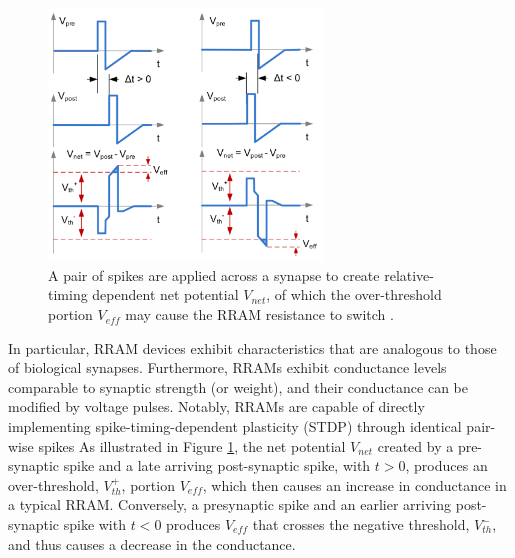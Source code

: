 \begin{figure}[htbp!] 
    \centering    
    \includegraphics[width=0.65\textwidth]{Chapter6/Figs/f.png}
    \caption[A pair of spikes are applied across a synapse to create relative-timing dependent net potential.]{A pair of spikes are applied across a synapse to create relative-timing dependent net potential $V_{net}$, of which the over-threshold portion $V_{eff}$ may cause the RRAM resistance to switch \cite{wu2017enabling}.}
    \label{fig:6f}
\end{figure}

\noindent In particular, RRAM devices exhibit characteristics that are analogous to those of biological synapses. Furthermore, RRAMs exhibit conductance levels comparable to synaptic strength (or weight), and their conductance can be modified by voltage pulses. Notably, RRAMs are capable of directly implementing spike-timing-dependent plasticity (STDP) through identical pair-wise spikes As illustrated in Figure \ref{fig:6f}, the net potential $V_{net}$ created by a pre-synaptic spike and a late arriving post-synaptic spike, with $t > 0$, produces an over-threshold, $V_{th}^+$, portion $V_{eff}$, which then causes an increase in conductance in a typical RRAM. Conversely, a presynaptic spike and an earlier arriving post-synaptic spike with $t < 0$ produces $V_{eff}$ that crosses the negative threshold, $V_{th}^-$, and thus causes a decrease in the conductance. \\


